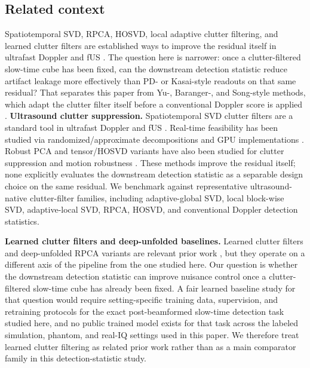 \documentclass[11pt]{article}
\newif\ifPAPERONLY
\begin{document}
\subsection{Related context}
\ifPAPERONLY
Spatiotemporal SVD, RPCA, HOSVD, local adaptive clutter filtering, and learned clutter filters are established ways to improve the residual itself in ultrafast Doppler and fUS \cite{DemeneClutterSVD2015,BarangerAdaptiveSVD2018,CandesRPCA,SolomonDeepUnfoldedRPCA2020,HuangAdaptiveHOSVD2024}. The question here is narrower: once a clutter-filtered slow-time cube has been fixed, can the downstream detection statistic reduce artifact leakage more effectively than PD- or Kasai-style readouts on that same residual? That separates this paper from Yu-, Baranger-, and Song-style methods, which adapt the clutter filter itself before a conventional Doppler score is applied \cite{YuLovstakkenEigenReview2010,SongBlockwiseLocal2017,CheeGPUEigen2017}.
\else
\textbf{Ultrasound clutter suppression.} Spatiotemporal SVD clutter filters are a standard tool in ultrafast Doppler and fUS \cite{DemeneClutterSVD2015,BarangerAdaptiveSVD2018,Mace2013,Rabut2020,ICDFUS2021}. Real-time feasibility has been studied via randomized/approximate decompositions and GPU implementations \cite{LokRandomizedSVD2020,CheeGPUEigen2017}. Robust PCA and tensor/HOSVD variants have also been studied for clutter suppression and motion robustness \cite{CandesRPCA,SolomonDeepUnfoldedRPCA2020,HuangAdaptiveHOSVD2024}. These methods improve the residual itself; none explicitly evaluates the downstream detection statistic as a separable design choice on the same residual. We benchmark against representative ultrasound-native clutter-filter families, including adaptive-global SVD, local block-wise SVD, adaptive-local SVD, RPCA, HOSVD, and conventional Doppler detection statistics.

\textbf{Learned clutter filters and deep-unfolded baselines.} Learned clutter filters and deep-unfolded RPCA variants are relevant prior work \cite{SolomonDeepUnfoldedRPCA2020}, but they operate on a different axis of the pipeline from the one studied here. Our question is whether the downstream detection statistic can improve nuisance control once a clutter-filtered slow-time cube has already been fixed. A fair learned baseline study for that question would require setting-specific training data, supervision, and retraining protocols for the exact post-beamformed slow-time detection task studied here, and no public trained model exists for that task across the labeled simulation, phantom, and real-IQ settings used in this paper. We therefore treat learned clutter filtering as related prior work rather than as a main comparator family in this detection-statistic study.
\end{document}

